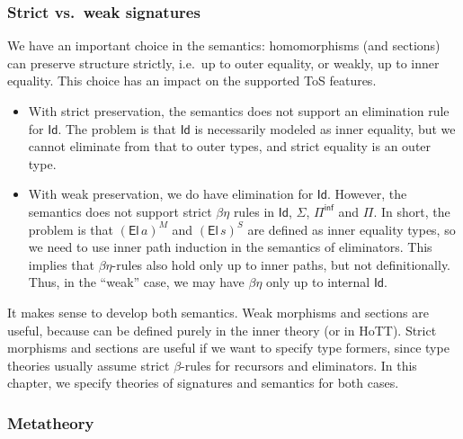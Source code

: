 \documentclass[12pt,a4paper,twoside,openany]{book}
\theoremstyle{remark}
\theoremstyle{definition}
\theoremstyle{theorem}
\newcommand{\El}{\mathsf{El}}
\newcommand{\Id}{\mathsf{Id}}
\newcommand{\Piinf}{\Pi^{\mathsf{inf}}}
\begin{document}
\subsubsection{Strict vs.\ weak signatures}

We have an important choice in the semantics: homomorphisms (and sections) can
preserve structure strictly, i.e.\ up to outer equality, or weakly, up to inner
equality. This choice has an impact on the supported ToS features.
\begin{itemize}
\item
  With strict preservation, the semantics does not support an elimination
  rule for $\Id$. The problem is that $\Id$ is necessarily modeled as inner
  equality, but we cannot eliminate from that to outer types, and strict
  equality is an outer type.
\item
  With weak preservation, we do have elimination for $\Id$. However, the
  semantics does not support strict $\beta\eta$ rules in $\Id$, $\Sigma$,
  $\Piinf$ and $\Pi$.  In short, the problem is that $(\El\,a)^M$ and
  $(\El\,s)^S$ are defined as inner equality types, so we need to use inner path
  induction in the semantics of eliminators. This implies that $\beta\eta$-rules
  also hold only up to inner paths, but not definitionally. Thus, in the
  ``weak'' case, we may have $\beta\eta$ only up to internal $\Id$.
\end{itemize}
It makes sense to develop both semantics. Weak morphisms and sections are
useful, because can be defined purely in the inner theory (or in HoTT). Strict
morphisms and sections are useful if we want to specify type formers, since type
theories usually assume strict $\beta$-rules for recursors and eliminators. In
this chapter, we specify theories of signatures and semantics for both cases.

\subsubsection{Metatheory}
\end{document}
